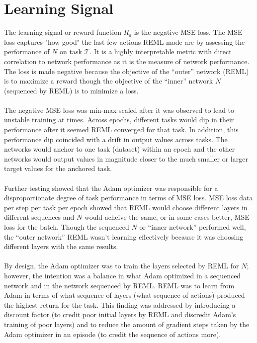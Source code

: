 \section{Learning Signal}
The learning signal or reward function $R_{a}$ is the negative MSE loss.
The MSE loss captures "how good" the last few actions REML made are by assessing 
the performance of $N$ on task $\mathcal{T}$. It is a highly interpretable metric with
direct correlation to network performance as it is the measure of network performance. The loss is made negative because the objective of the 
``outer'' network (REML) is to maximize a reward though the objective
of the ``inner'' network $N$ (sequenced by REML) is to minimize a loss. 
\\\\
The negative MSE loss was min-max scaled after it was observed to lead to
unstable training at times. Across epochs, different tasks would dip in their 
performance after it seemed REML converged for that task.
In addition, this performance dip coincided with a drift in output values across tasks.
The networks would anchor to one task (dataset) within an epoch and the other networks 
would output values in magnitude closer to the much smaller or larger target values 
for the anchored task.
\\\\
Further testing showed that the Adam optimizer was responsible for a 
disproportionate degree of task performance in terms of MSE loss. MSE loss data per 
step per task per epoch showed that REML would choose different layers in different 
sequences and $N$ would acheive the same, or in some cases better, MSE loss 
for the batch. 
Though the sequenced $N$  or ``inner network'' performed well, the 
``outer network'' REML wasn't learning effectively because it was choosing different
layers with the same results. 
\\\\
By design, the Adam optimizer was to train the layers selected by REML for $N$; 
however, the intention was a balance in what Adam optimized in a sequenced network 
and in the network sequenced by REML. REML was to learn from Adam in terms of what 
sequence of layers (what sequence of actions) produced the highest return for the 
task. This finding was addressed by introducing a discount factor (to credit poor 
initial layers by REML and discredit Adam's training of poor layers) and to reduce 
the amount of gradient steps taken by the Adam optimizer in an episode (to credit 
the sequence of actions more).
\\\\
